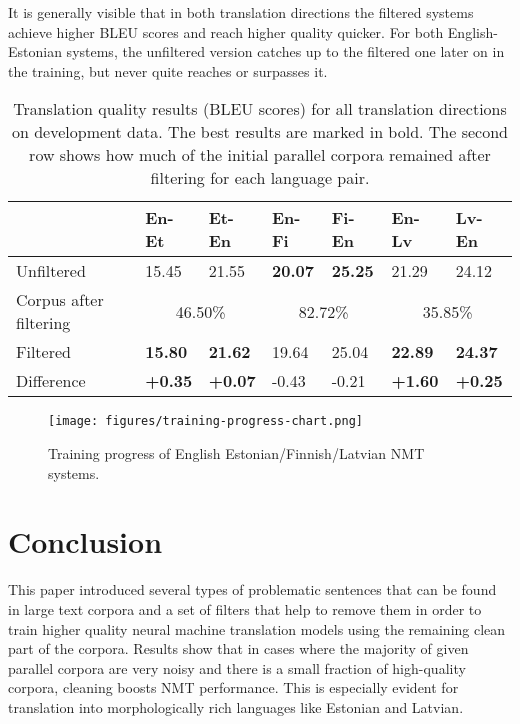 \documentclass{IOS-Book-Article}
\begin{document}
It is generally visible that in both translation directions the filtered systems achieve higher BLEU scores and reach higher quality quicker. For both English-Estonian systems, the unfiltered version catches up to the filtered one later on in the training, but never quite reaches or surpasses it. 

\begin{table}[h]
    \caption{Translation quality results (BLEU scores) for all translation directions on development data. The best results are marked in bold. The second row shows how much of the initial parallel corpora remained after filtering for each language pair.}
    \begin{tabular}{lllllll}
    \hline
     & En-Et & Et-En & En-Fi & Fi-En & En-Lv & Lv-En \\ \hline
    Unfiltered & 15.45 & 21.55 & \textbf{20.07} & \textbf{25.25} & 21.29 & 24.12 \\
    Corpus after filtering & \multicolumn{2}{c}{46.50\%} & \multicolumn{2}{c}{82.72\%} & \multicolumn{2}{c}{35.85\%} \\
    Filtered & \textbf{15.80} & \textbf{21.62} & 19.64 & 25.04 & \textbf{22.89} & \textbf{24.37} \\
    Difference & \textbf{+0.35} & \textbf{+0.07} & -0.43 & -0.21 & \textbf{+1.60} & \textbf{+0.25} \\ \hline
    \end{tabular}
    \label{tab:mt-results}
\end{table}

\begin{figure}[h]
  \texttt{[image: figures/training-progress-chart.png]}
  \caption{Training progress of English  Estonian/Finnish/Latvian NMT systems.}
  \label{fig:NMTProgress}
\end{figure}

\section{Conclusion} 
\label{sec:conclusion}

This paper introduced several types of problematic sentences that can be found in large text corpora and a set of filters that help to remove them in order to train higher quality neural machine translation models using the remaining clean part of the corpora. Results show that in cases where the majority of given parallel corpora are very noisy and there is a small fraction of high-quality corpora, cleaning boosts NMT performance. This is especially evident for translation into morphologically rich languages like Estonian and Latvian.
\end{document}
